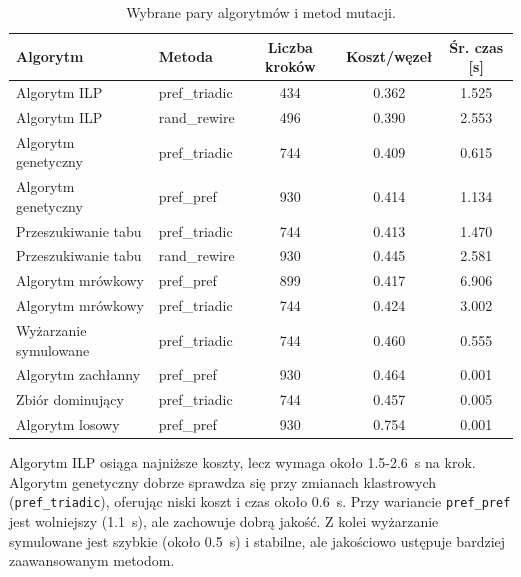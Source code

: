 \begin{table}[H]
  \centering
  \caption{Wybrane pary algorytmów i metod mutacji.}
  \label{tab:dyn-synth-selected-best}
  \begin{tabular}{llccc}
    \toprule
    \textbf{Algorytm}     & \textbf{Metoda} & \textbf{Liczba kroków} & \textbf{Koszt/węzeł} & \textbf{Śr. czas [s]} \\
    \midrule
    Algorytm ILP          & pref\_triadic   & 434                    & 0.362                & 1.525                 \\
    Algorytm ILP          & rand\_rewire    & 496                    & 0.390                & 2.553                 \\
    Algorytm genetyczny   & pref\_triadic   & 744                    & 0.409                & 0.615                 \\
    Algorytm genetyczny   & pref\_pref      & 930                    & 0.414                & 1.134                 \\
    Przeszukiwanie tabu   & pref\_triadic   & 744                    & 0.413                & 1.470                 \\
    Przeszukiwanie tabu   & rand\_rewire    & 930                    & 0.445                & 2.581                 \\
    Algorytm mrówkowy     & pref\_pref      & 899                    & 0.417                & 6.906                 \\
    Algorytm mrówkowy     & pref\_triadic   & 744                    & 0.424                & 3.002                 \\
    Wyżarzanie symulowane & pref\_triadic   & 744                    & 0.460                & 0.555                 \\
    Algorytm zachłanny    & pref\_pref      & 930                    & 0.464                & 0.001                 \\
    Zbiór dominujący      & pref\_triadic   & 744                    & 0.457                & 0.005                 \\
    Algorytm losowy       & pref\_pref      & 930                    & 0.754                & 0.001                 \\
    \bottomrule
  \end{tabular}
\end{table}

Algorytm ILP osiąga najniższe koszty, lecz wymaga około 1.5-\SI{2.6}{\second} na krok. Algorytm genetyczny dobrze sprawdza się przy zmianach klastrowych (\texttt{pref\_triadic}), oferując niski koszt i czas około \SI{0.6}{\second}. Przy wariancie \texttt{pref\_pref} jest wolniejszy (\SI{1.1}{\second}), ale zachowuje dobrą jakość. Z kolei wyżarzanie symulowane jest szybkie (około \SI{0.5}{\second}) i stabilne, ale jakościowo ustępuje bardziej zaawansowanym metodom.

